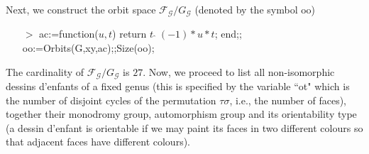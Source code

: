 \documentclass[12pt]{amsart}
\theoremstyle{remark}
\begin{document}
Next, we construct the orbit space ${\mathcal F}_{\mathcal G}/G_{\mathcal G}$ (denoted by the symbol oo)
\begin{enumerate}
\item[$>$] ac:=function($u,t$) return $t\;\hat{\mbox{}}\;(-1)*u*t$; end;; oo:=Orbits(G,xy,ac);;Size(oo);

\end{enumerate}

The cardinality of ${\mathcal F}_{\mathcal G}/G_{\mathcal G}$ is $27$. Now, we proceed to list all non-isomorphic dessins d'enfants of a fixed genus (this is specified by the variable ``ot" which is the number of disjoint cycles of the permutation $\tau\sigma$, i.e., the number of faces), together their monodromy group, automorphism group and its orientability type (a dessin d'enfant  is orientable if we may paint its faces in two different colours so that adjacent faces have different colours).
\end{document}
